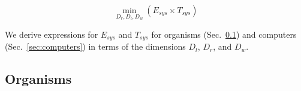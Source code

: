 \documentclass[12pt]{article}
\begin{document}
\begin{equation}
  \min_{D_r,D_l,D_w}(E_{sys} \times T_{sys})
\label{eq:TheWholeEnchilada}
\end{equation}


We derive expressions for $E_{sys}$ and $T_{sys}$ for organisms
(Sec.~\ref{sec:organisms}) and computers (Sec.~\ref{sec:computers}) in
terms of the dimensions $D_l$, $D_r$, and $D_w$.  







\subsection{Organisms}
\label{sec:organisms}
\end{document}
